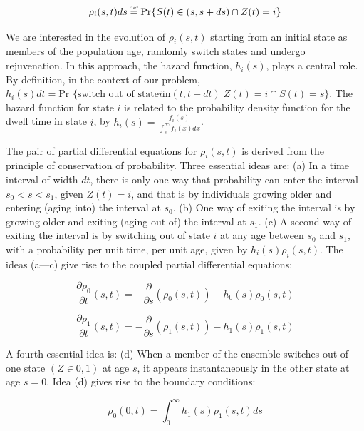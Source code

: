 \begin{equation}
\rho_i(s,t)ds \defeq \text{Pr}\{S(t)\in (s,s+ds) \cap Z(t)=i\}
\label{eqn:population}
\end{equation}

We are interested in the evolution of $\rho_i (s,t)$ starting from an initial state as members of the population age, randomly switch states and undergo rejuvenation. In this approach, the hazard function, $h_i (s)$, plays a central role. By definition, in the context of our problem, $h_i (s)dt=\text{Pr \{switch out of state} i \text{in} (t,t+dt) | Z(t)=i \cap S(t)=s\}$. The hazard function for state $i$ is related to the probability density function for the dwell time in state $i$, by $h_i (s)=\frac{f_i (s)}{\int_s^\infty f_i (x)  dx}$. 

The pair of partial differential equations for $\rho_i(s,t)$ is derived from the principle of conservation of probability. Three essential ideas are: (a) In a time interval of width $dt$, there is only one way that probability can enter the interval $s_0<s<s_1$, given $Z(t)=i$, and that is by individuals growing older and entering (aging into) the interval at $s_0$. (b) One way of exiting the interval is by growing older and exiting (aging out of) the interval at $s_1$. (c) A second way of exiting the interval is by switching out of state $i$ at any age between $s_0$ and $s_1$, with a probability per unit time, per unit age, given by $h_i (s)  \rho_i (s,t)$. The ideas (a—c) give rise to the coupled partial differential equations:

\begin{equation}
\frac{\partial \rho_0}{\partial t}(s,t) = -\frac{\partial}{\partial s}(\rho_0(s,t)) - h_0(s) \rho_0(s,t)
\label{eqn:partial0}
\end{equation}

\begin{equation}
\frac{\partial \rho_1}{\partial t}(s,t) = -\frac{\partial}{\partial s}(\rho_1(s,t)) - h_1(s) \rho_1(s,t)
\label{eqn:partial1}
\end{equation}

A fourth essential idea is: (d) When a member of the ensemble switches out of one state $(Z \in {0,1})$ at age $s$, it appears instantaneously in the other state at age $s=0$. Idea (d) gives rise to the boundary conditions:

\begin{equation}
\rho_0(0,t) = \int_0^{\infty} h_1(s) \rho_1(s,t) ds
\label{eqn:bound1}
\end{equation}


